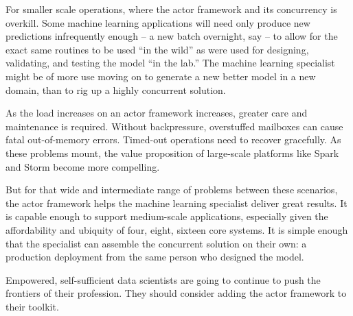 \documentclass[tablecaption=bottom,wcp]{jmlr}
\begin{document}
For smaller scale operations, where the actor framework and its concurrency 
is overkill. Some machine learning applications will need only produce 
new predictions infrequently enough -- a new batch overnight, say -- to allow
for the exact
same routines to be used ``in the wild'' as were used for designing, validating,
and testing the model ``in the lab.'' The machine learning specialist might be
of more use moving on to generate a new better model in a new domain, than 
to rig up a highly concurrent solution.

As the load increases on an actor framework increases, greater care and
maintenance is required. Without backpressure, overstuffed mailboxes can
cause fatal out-of-memory errors. Timed-out operations need to recover gracefully.
As these problems mount, the value proposition of large-scale platforms like
Spark and Storm become more compelling.

But for that wide and intermediate range of problems between these 
scenarios, the actor framework helps the machine learning specialist
deliver great results. It is capable enough to support medium-scale
applications, especially given the affordability and ubiquity of four, eight, 
sixteen core systems. It is simple enough that the specialist can assemble the
concurrent solution on their own: a production deployment from the same
person who designed the model.

Empowered, self-sufficient data scientists are going to continue to push the 
frontiers of their profession. They should consider adding the actor 
framework to their toolkit.


%
\end{document}
